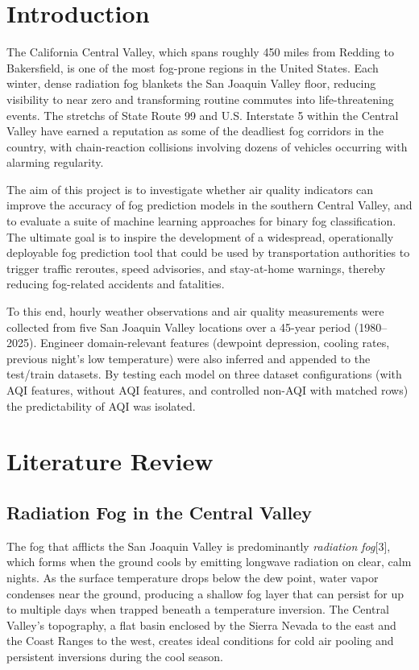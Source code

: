 \documentclass[
  letterpaper,
  DIV=11,
  numbers=noendperiod]{scrartcl}
\begin{document}
\section{Introduction}\label{introduction}

The California Central Valley, which spans roughly 450 miles from
Redding to Bakersfield, is one of the most fog-prone regions in the
United States. Each winter, dense radiation fog blankets the San Joaquin
Valley floor, reducing visibility to near zero and transforming routine
commutes into life-threatening events. The stretchs of State Route 99
and U.S. Interstate 5 within the Central Valley have earned a reputation
as some of the deadliest fog corridors in the country, with
chain-reaction collisions involving dozens of vehicles occurring with
alarming regularity.

The aim of this project is to investigate whether air quality indicators
can improve the accuracy of fog prediction models in the southern
Central Valley, and to evaluate a suite of machine learning approaches
for binary fog classification. The ultimate goal is to inspire the
development of a widespread, operationally deployable fog prediction
tool that could be used by transportation authorities to trigger traffic
reroutes, speed advisories, and stay-at-home warnings, thereby reducing
fog-related accidents and fatalities.

To this end, hourly weather observations and air quality measurements
were collected from five San Joaquin Valley locations over a 45-year
period (1980--2025). Engineer domain-relevant features (dewpoint
depression, cooling rates, previous night's low temperature) were also
inferred and appended to the test/train datasets. By testing each model
on three dataset configurations (with AQI features, without AQI
features, and controlled non-AQI with matched rows) the predictability
of AQI was isolated.

\section{Literature Review}\label{literature-review}

\subsection{Radiation Fog in the Central
Valley}\label{radiation-fog-in-the-central-valley}

The fog that afflicts the San Joaquin Valley is predominantly
\emph{radiation fog}{[}3{]}, which forms when the ground cools by
emitting longwave radiation on clear, calm nights. As the surface
temperature drops below the dew point, water vapor condenses near the
ground, producing a shallow fog layer that can persist for up to
multiple days when trapped beneath a temperature inversion. The Central
Valley's topography, a flat basin enclosed by the Sierra Nevada to the
east and the Coast Ranges to the west, creates ideal conditions for cold
air pooling and persistent inversions during the cool season.
\end{document}

